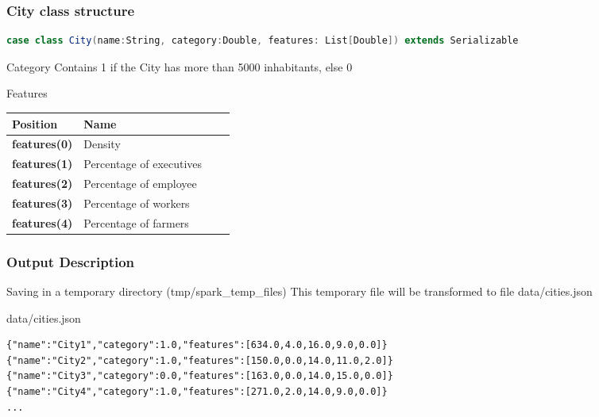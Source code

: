\documentclass[slidetop,9pt,utf8]{beamer}
\begin{document}
\begin{CJK}{UTF8}{gbsn}
\begin{frame}[fragile]
  \frametitle{City class structure}

  \begin{lstlisting}[label=CityClassOverview, caption=psug.hands.on.exercise05.City class overview, language=scala, style=code]
case class City(name:String, category:Double, features: List[Double]) extends Serializable
  \end{lstlisting}

  \begin{block}{Category}
    Contains 1 if the City has more than 5000 inhabitants, else 0
  \end{block}

  \begin{block}{Features}
    \begin{center}
      \begin{tabular}{|l|l|l|l|}
            \hline 
            \rowcolor{gray} \textbf{Position} & \textbf{Name} \\ \hline
            \textbf{features(0)} & Density \\ \hline
            \textbf{features(1)} & Percentage of executives \\ \hline
            \textbf{features(2)} & Percentage of employee \\ \hline
            \textbf{features(3)} & Percentage of workers \\ \hline
            \textbf{features(4)} & Percentage of farmers \\ \hline
      \end{tabular}
    \end{center}
  \end{block}

\end{frame}

\begin{frame}[fragile]

  \frametitle{Output Description}
  
  \begin{block}{Saving in a temporary directory (tmp/spark\_temp\_files)}
    This temporary file will be transformed to file data/cities.json
  \end{block}


  \begin{block}{data/cities.json}
    \begin{verbatim}
{"name":"City1","category":1.0,"features":[634.0,4.0,16.0,9.0,0.0]}
{"name":"City2","category":1.0,"features":[150.0,0.0,14.0,11.0,2.0]}
{"name":"City3","category":0.0,"features":[163.0,0.0,14.0,15.0,0.0]}
{"name":"City4","category":1.0,"features":[271.0,2.0,14.0,9.0,0.0]}
...
    \end{verbatim}
  \end{block}


\end{frame}
\end{CJK}
\end{document}
